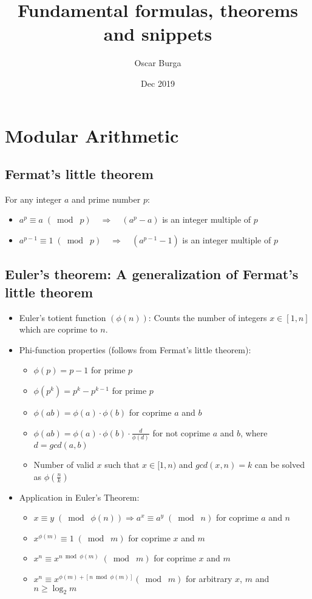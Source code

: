 \documentclass[11pt]{article}
\title{\textbf{Fundamental formulas, theorems and snippets}}
\author{Oscar Burga}
\date{Dec 2019}
\begin{document}
\maketitle

\section{Modular Arithmetic}
	\subsection{Fermat's little theorem}
		For any integer $a$ and prime number $p$:
			\begin{itemize}
				\item $ a^p \equiv a\;(\bmod\;p)\quad\Rightarrow\quad 
						(a^p-a)$ is an integer multiple of $p$ 
				\item $ a^{p-1} \equiv 1\;(\bmod\;p)\quad\Rightarrow\quad 
						(a^{p-1}-1)$ is an integer multiple of $p$
			\end{itemize}
	\subsection {Euler's theorem: A generalization of Fermat's little theorem}
		\begin{itemize}
			\item Euler's totient function $(\phi(n))$:
					Counts the number of integers $x\in[1,n]$ which are coprime to $n$.
			\item Phi-function properties (follows from Fermat's little theorem): 
				\begin {itemize}
					\item $ \phi(p) = p-1 $ for prime $p$
					\item $ \phi(p^k)= p^k - p^{k-1}$ for prime $p$
					\item $ \phi(ab) = \phi(a)\cdot\phi(b)$ for coprime $a$ and $b$
					\item $ \phi(ab) = \phi(a)\cdot\phi(b)\cdot\frac{d}{\phi(d)}$ 
							for not coprime $a$ and $b$, where $d = gcd(a,b)$ 
					\item Number of valid $x$ such that $x\in[1,n)$ and $gcd(x, n) = k$
							can be solved as $\phi(\frac{n}{k})$
				\end {itemize}
			\item Application in Euler's Theorem:
				\begin {itemize}
					\item $x \equiv y\;(\bmod\;\phi(n))\Rightarrow a^x\equiv a^y\;(\bmod\;n)$
						for coprime $a$ and $n$
					\item $x^{\phi(m)} \equiv 1\;(\bmod\;m)$ for coprime $x$ and $m$
					\item $ x^n \equiv x^{n\bmod \phi(m)}\;(\bmod\;m) $ for coprime $x$ and $m$
					\item $x^n \equiv x^{\phi(m) + [n\bmod\phi(m)]} (\bmod\;m)$
							for arbitrary $x$, $m$ and $n\geq\log_{2}m$
				\end {itemize}
		\end{itemize}
\end{document}
